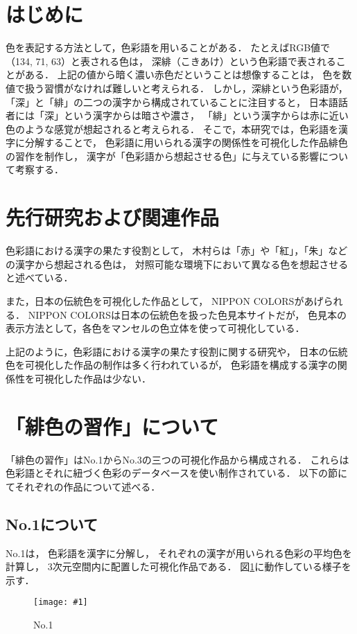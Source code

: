\documentclass[a4j,twocolumn]{ujarticle} %
\newcommand{\workname}{緋色の習作}
\newcommand{\colorname}{色彩語}
\newcommand{\mysection}[1]{\vspace{-20pt}\section{#1}}
\newcommand{\mysubsection}[1]{\vspace{-12pt}\subsection{#1}}
\newcommand{\myfigure}[2]{
\begin{figure}[htbp]
  \begin{center}
    \texttt{[image: \#1]}
    \caption{No.1}
    \label{#2}
  \end{center}
\end{figure}
\vspace{-2zh}
}
\begin{document}
\maketitle
\thispagestyle{myheadings}

\mysection{はじめに}

色を表記する方法として，\colorname{}を用いることがある．
たとえばRGB値で（134, 71, 63）と表される色は，
深緋（こきあけ）という\colorname{}で表されることがある．
上記の値から暗く濃い赤色だということは想像することは，
色を数値で扱う習慣がなければ難しいと考えられる．
しかし，深緋という\colorname{}が，
「深」と「緋」の二つの漢字から構成されていることに注目すると，
日本語話者には「深」という漢字からは暗さや濃さ，
「緋」という漢字からは赤に近い色のような感覚が想起されると考えられる．
そこで，本研究では，\colorname{}を漢字に分解することで，
\colorname{}に用いられる漢字の関係性を可視化した作品\workname{}を制作し，
漢字が「\colorname{}から想起させる色」に与えている影響について考察する．

\mysection{先行研究および関連作品}

色彩語における漢字の果たす役割として，
木村ら\cite{Kimura1998}は「赤」や「紅」，「朱」などの漢字から想起される色は，
対照可能な環境下において異なる色を想起させると述べている．

また，日本の伝統色を可視化した作品として，
NIPPON COLORS\cite{NipponColors}があげられる．
NIPPON COLORSは日本の伝統色を扱った色見本サイトだが，
色見本の表示方法として，各色をマンセルの色立体を使って可視化している．

上記のように，色彩語における漢字の果たす役割に関する研究や，
日本の伝統色を可視化した作品の制作は多く行われているが，
色彩語を構成する漢字の関係性を可視化した作品は少ない．

\section{「\workname{}」について}

「\workname{}」はNo.1からNo.3の三つの可視化作品から構成される．
これらは\colorname{}とそれに紐づく色彩のデータベースを使い制作されている．
以下の節にてそれぞれの作品について述べる．

\mysubsection{No.1について}

No.1は，
\colorname{}を漢字に分解し，
それぞれの漢字が用いられる色彩の平均色を計算し，
3次元空間内に配置した可視化作品である．
図\ref{no1}に動作している様子を示す．

\myfigure{fig/kanji-color-space.eps}{no1}
\end{document}

